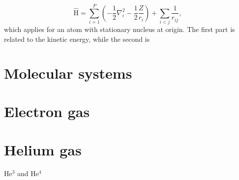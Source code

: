 \begin{equation}
\label{eq:AtomicHamiltonian}
\hat{\text{H}} = \sum_{i=1}^{P} (-\frac{1}{2} \nabla_i^2 - \frac{1}{2} \frac{Z}{r_i}) + \sum_{i<j} \frac{1}{r_{ij}},
\end{equation}
which applies for an atom with stationary nucleus at origin. The first part is related to the kinetic energy, while the second is 

\section{Molecular systems}

\section{Electron gas} \label{subsubsec:electrongas}
\section{Helium gas} \label{subsubsec:heliumgas}
He$^3$ and He$^4$